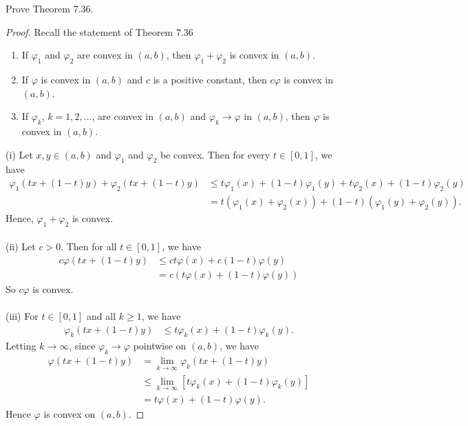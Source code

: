 \begin{problem}
Prove Theorem 7.36.
\end{problem}
\begin{proof}
Recall the statement of Theorem 7.36
\begin{theorem*}
\begin{enumerate}[label=\textnormal{(\roman*)}]
\item If $\varphi_1$ and $\varphi_2$ are convex in $(a,b)$, then
  $\varphi_1+\varphi_2$ is convex in $(a,b)$.
\item If $\varphi$ is convex in $(a,b)$ and $c$ is a positive constant,
  then $c\varphi$ is convex in $(a,b)$.
\item If $\varphi_k$, $k=1,2,\dotsc$, are convex in $(a,b)$ and
  $\varphi_k\to\varphi$ in $(a,b)$, then $\varphi$ is convex in $(a,b)$.
\end{enumerate}
\end{theorem*}

\bigskip

(i) Let $x,y\in(a,b)$ and $\varphi_1$ and $\varphi_2$ be convex. Then
for every $t\in[0,1]$, we have
\begin{equation}
\label{eq:10:sum-convex}
\begin{aligned}
\varphi_1(tx+(1-t)y)+\varphi_2(tx+(1-t)y)
&\leq t\varphi_1(x)+(1-t)\varphi_1(y)+t\varphi_2(x)+(1-t)\varphi_2(y)\\
&=t(\varphi_1(x)+\varphi_2(x))+(1-t)(\varphi_1(y)+\varphi_2(y)).
\end{aligned}
\end{equation}
Hence, $\varphi_1+\varphi_2$ is convex.
\\\\
(ii) Let $c>0$. Then for all $t\in[0,1]$, we have
\begin{equation}
\label{eq:10:const-mult-conv}
\begin{aligned}
c\varphi(tx+(1-t)y)
&\leq ct\varphi(x)+c(1-t)\varphi(y)\\
&=c(t\varphi(x)+(1-t)\varphi(y))
\end{aligned}
\end{equation}
So $c\varphi$ is convex.
\\\\
(iii) For $t\in[0,1]$ and all $k\geq 1$, we have
\begin{equation}
\label{eq:10:seq-conv}
\begin{aligned}
\varphi_k(tx+(1-t)y)
&\leq t\varphi_k(x)+(1-t)\varphi_k(y).
\end{aligned}
\end{equation}
Letting $k\to\infty$, since $\varphi_k\to\varphi$ pointwise on $(a,b)$, we
have
\begin{equation}
\label{eq:10:conv-convergence}
\begin{aligned}
\varphi(tx+(1-t)y)
&=\lim_{k\to\infty} \varphi_k(tx+(1-t)y)\\
&\leq\lim_{k\to\infty}\left[{t\varphi_k(x)+(1-t)\varphi_k(y)}\right]\\
&=t\varphi(x)+(1-t)\varphi(y).
\end{aligned}
\end{equation}
Hence $\varphi$ is convex on $(a,b)$.
\end{proof}

